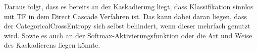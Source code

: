 Daraus folgt, dass es bereits an der Kaskadierung liegt, dass Klassifikation sinnlos mit TF in dem Direct Cascade Verfahren ist. 
Das kann dabei daran liegen, dass der CategoricalCrossEntropy sich selbst behindert, wenn dieser mehrfach genutzt wird. Sowie es auch an der 
Softmax-Aktivierungsfunktion oder die Art und Weise des Kaskadierens liegen könnte. 
